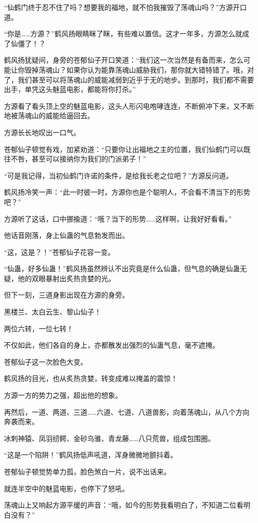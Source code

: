 \begin{this_body}
“仙鹤门终于忍不住了吗？想要我的福地，就不怕我摧毁了荡魂山吗？”方源开口道。

“你是……方源？”鹤风扬眼睛眯了眯，有些难以置信。这才一年多，方源怎么就成了仙僵了！？

鹤风扬犹疑间，身旁的苍郁仙子开口笑道：“我们这一次当然是有备而来，怎么可能让你毁掉荡魂山？如果你认为能靠荡魂山威胁我们，那你就大错特错了。哦，对了，我们甚至可以将荡魂山的威能减弱到近乎于无的地步。到那时，我们都不需要出手，单凭这头魅蓝电影，都能将你打杀。”

方源看了看头顶上空的魅蓝电影，这头人形闪电咆哮连连，不断俯冲下来，又不断地被荡魂山的威能给逼回去。

方源长长地叹出一口气。

苍郁仙子顿觉有戏，加紧劝道：“只要你让出福地之主的位置，我们仙鹤门可以既往不咎，甚至可以接纳你为我们的门派弟子！”

“可是我记得，当初仙鹤门许诺的条件，是给我长老之位吧？”方源反问道。

鹤风扬冷笑一声：“此一时彼一时，方源你也是个聪明人，不会看不清当下的形势吧？”

方源听了这话，口中挪揄道：“哦？当下的形势……这样啊，让我好好看看。”

他话音刚落，身上仙蛊的气息勃发而出。

“这，这是？！”苍郁仙子花容一变。

“仙蛊，好多仙蛊！”鹤风扬虽然辨认不出究竟是什么仙蛊，但气息的确是仙蛊无疑，他的双眼暴射出炙热贪婪的光。

但下一刻，三道身影出现在方源的身旁。

黑楼兰、太白云生、黎山仙子！

两位六转，一位七转！

不仅如此，他们各自的身上，亦都散发出强烈的仙蛊气息，毫不遮掩。

苍郁仙子这一次脸色大变。

鹤风扬的目光，也从炙热贪婪，转变成难以掩盖的震惊！

方源一方的势力之强，超出他的想象。

再然后，一道、两道、三道……六道、七道、八道兽影，向着荡魂山，从八个方向奔袭而来。

冰刺神猿、凤羽纫鳄、金砂乌骓、青龙藤……八只荒兽，组成包围圈。

“这是一个陷阱！”鹤风扬低声吼道，浑身微微地颤抖着。

苍郁仙子顿觉势单力孤，脸色煞白一片，说不出话来。

就连半空中的魅蓝电影，也停下了怒吼。

荡魂山上又响起方源平缓的声音：“哦，如今的形势我看明白了，不知道二位看明白没有？”

\end{this_body}

